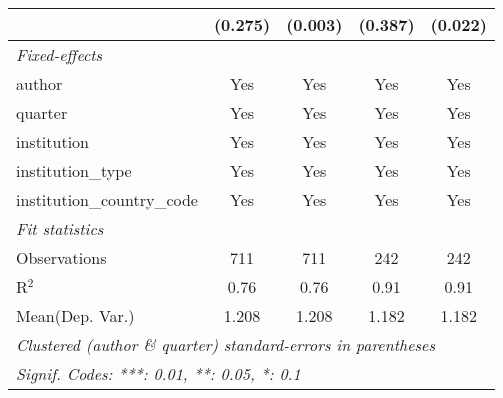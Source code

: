 \begin{tabular}{lcccc}
                                            & (0.275) & (0.003) & (0.387)   & (0.022)\\   
   \midrule
   \emph{Fixed-effects}\\
   author                                   & Yes     & Yes     & Yes       & Yes\\  
   quarter                                  & Yes     & Yes     & Yes       & Yes\\  
   institution                              & Yes     & Yes     & Yes       & Yes\\  
   institution\_type                        & Yes     & Yes     & Yes       & Yes\\  
   institution\_country\_code               & Yes     & Yes     & Yes       & Yes\\  
   \midrule
   \emph{Fit statistics}\\
   Observations                             & 711     & 711     & 242       & 242\\  
   R$^2$                                    & 0.76    & 0.76    & 0.91      & 0.91\\  
Mean(Dep. Var.) & 1.208 & 1.208 & 1.182 & 1.182 \\
   \midrule \midrule
   \multicolumn{5}{l}{\emph{Clustered (author \& quarter) standard-errors in parentheses}}\\
   \multicolumn{5}{l}{\emph{Signif. Codes: ***: 0.01, **: 0.05, *: 0.1}}\\
\end{tabular}
\par\endgroup
